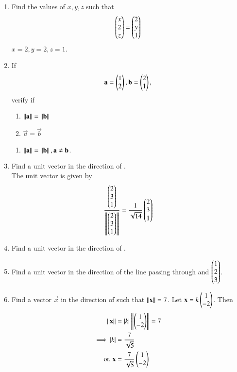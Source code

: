 \renewcommand{\theequation}{\theenumi}
\begin{enumerate}[label=\arabic*.,ref=\thesubsection.\theenumi]

\item Find the values of $x, y, z$ such that 
\begin{align}
\begin{pmatrix}x\\2\\z\end{pmatrix}= \begin{pmatrix}2\\y\\1\end{pmatrix}
\end{align}
%
\solution $x = 2, y=2, z=1$.
%
\item If
\begin{align}
\mathbf{a} = \begin{pmatrix}1\\2\end{pmatrix}, \mathbf{b} = \begin{pmatrix}2\\1\end{pmatrix},
\end{align}
verify if  
\begin{enumerate}
\item $\left\lVert\mathbf{a}\right\rVert=\left\lVert\mathbf{b}\right\rVert$

\item $\vec{a}=\vec{b}$
\end{enumerate}
%
\solution
\begin{enumerate}
\item $\left\lVert\mathbf{a}\right\rVert=\left\lVert\mathbf{b}\right\rVert,\mathbf{a}\ne\mathbf{b}$.
\end{enumerate}
\item Find a unit vector in the  direction of .
%
\\
\solution The unit vector is given by 
\begin{align}
\frac{\begin{pmatrix}2\\3\\1\end{pmatrix}}{\left\lVert\begin{pmatrix}2\\3\\1\end{pmatrix}\right\rVert} = \frac{1}{\sqrt{14}}\begin{pmatrix}2\\3\\1\end{pmatrix}
\end{align}
%
%
\item Find a unit vector in the direction of .
%
\item Find a unit vector in the direction of the line passing through  and $\begin{pmatrix}1\\2\\3\end{pmatrix}$.
%
\item Find a vector $\vec{x}$ in the direction of  such that $\left\lVert\mathbf{x}\right\rVert = 7$.
%
\solution Let $\mathbf{x} = k\begin{pmatrix}1\\-2\end{pmatrix}$.  Then 
%
\begin{align}
\left\lVert\mathbf{x}\right\rVert &= \left\vert k\right\vert\left\lVert\begin{pmatrix}1\\-2\end{pmatrix}\right\rVert= 7
\\
\implies \left\vert k\right\vert &= \frac{7}{\sqrt{5}}
\\
\text{or, } \mathbf{x} &= \frac{7}{\sqrt{5}}\begin{pmatrix}1\\-2\end{pmatrix}
\end{align}
%


\end{enumerate}

